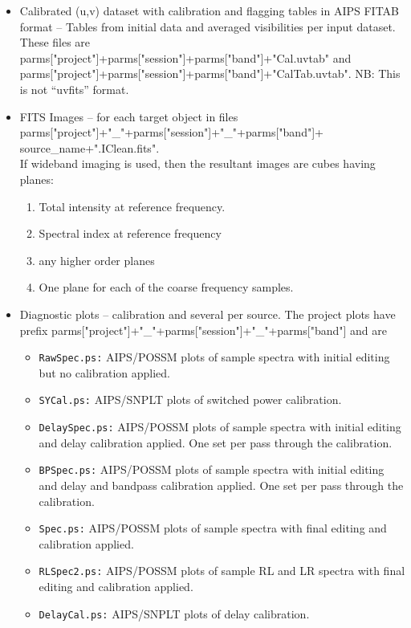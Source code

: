 \documentclass[11pt]{article}
\begin{document}
\begin{itemize}
\item Calibrated (u,v) dataset with calibration and flagging tables in
AIPS FITAB format -- Tables from initial data and averaged
visibilities per input dataset. 
These files are\\
parms["project"]+parms["session"]+parms["band"]+"Cal.uvtab"
and parms["project"]+parms["session"]+parms["band"]+"CalTab.uvtab".
NB: This is not ``uvfits'' format.
\item FITS Images -- for each target object in files\\
parms["project"]+"\_"+parms["session"]+"\_"+parms["band"]+\\
source\_name+".IClean.fits".\\
If wideband imaging is used, then the resultant images are cubes
having planes:
\begin{enumerate}
\item Total intensity at reference frequency.
\item Spectral index at reference frequency
\item any higher order planes
\item One plane for each of the coarse frequency samples.
\end{enumerate}
\item Diagnostic plots -- calibration and several per source.
The project plots have prefix
parms["project"]+"\_"+parms["session"]+"\_"+parms["band"] and are
\begin{itemize}
\item{\tt RawSpec.ps:} AIPS/POSSM plots of sample spectra with initial
editing but no calibration applied.
\item{\tt SYCal.ps:} AIPS/SNPLT plots of switched power calibration.
\item{\tt DelaySpec.ps:} AIPS/POSSM plots of sample spectra with initial
editing and delay calibration applied.
One set per pass through the calibration.
\item{\tt BPSpec.ps:} AIPS/POSSM plots of sample spectra with initial
editing and delay and bandpass calibration applied.
One set per pass through the calibration.
\item{\tt Spec.ps:} AIPS/POSSM plots of sample spectra with final
editing and calibration applied.
\item{\tt RLSpec2.ps:} AIPS/POSSM plots of sample RL and LR spectra
with final editing and calibration applied.
\item{\tt DelayCal.ps:} AIPS/SNPLT plots of delay calibration.

\end{itemize}
\end{itemize}
\end{document}
